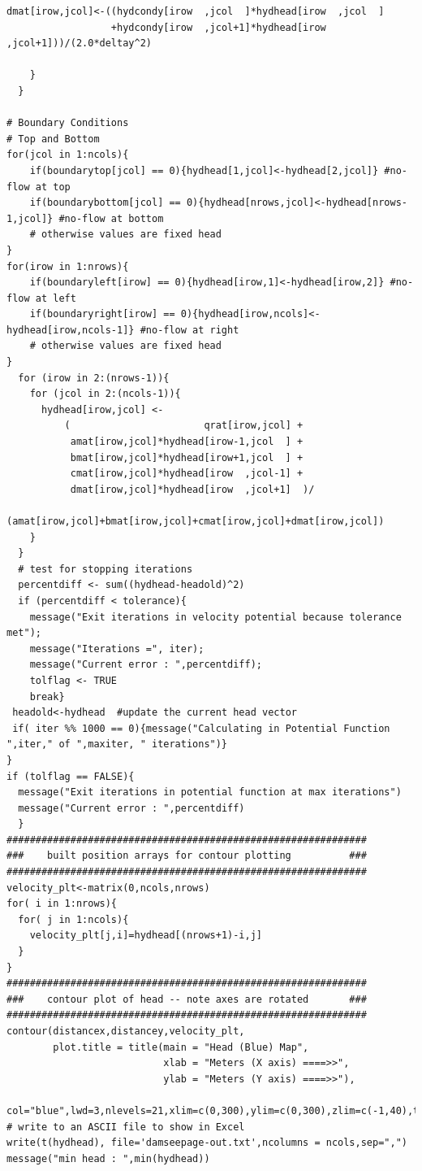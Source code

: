 \begin{lstlisting}[caption= \textbf{R} script implementing unconfined aquifer flow computations with wells and generalized boundary conditions. , label=lst:UnconfinedSteady]
      dmat[irow,jcol]<-((hydcondy[irow  ,jcol  ]*hydhead[irow  ,jcol  ]
                  +hydcondy[irow  ,jcol+1]*hydhead[irow  ,jcol+1]))/(2.0*deltay^2)
      
    }
  }  
  
# Boundary Conditions
# Top and Bottom
for(jcol in 1:ncols){
    if(boundarytop[jcol] == 0){hydhead[1,jcol]<-hydhead[2,jcol]} #no-flow at top
    if(boundarybottom[jcol] == 0){hydhead[nrows,jcol]<-hydhead[nrows-1,jcol]} #no-flow at bottom
    # otherwise values are fixed head
}
for(irow in 1:nrows){
    if(boundaryleft[irow] == 0){hydhead[irow,1]<-hydhead[irow,2]} #no-flow at left
    if(boundaryright[irow] == 0){hydhead[irow,ncols]<-hydhead[irow,ncols-1]} #no-flow at right
    # otherwise values are fixed head
}
  for (irow in 2:(nrows-1)){
    for (jcol in 2:(ncols-1)){
      hydhead[irow,jcol] <- 
          (                       qrat[irow,jcol] +
           amat[irow,jcol]*hydhead[irow-1,jcol  ] +
           bmat[irow,jcol]*hydhead[irow+1,jcol  ] +
           cmat[irow,jcol]*hydhead[irow  ,jcol-1] +
           dmat[irow,jcol]*hydhead[irow  ,jcol+1]  )/
        (amat[irow,jcol]+bmat[irow,jcol]+cmat[irow,jcol]+dmat[irow,jcol])
    }
  }
  # test for stopping iterations
  percentdiff <- sum((hydhead-headold)^2)
  if (percentdiff < tolerance){
    message("Exit iterations in velocity potential because tolerance met");
    message("Iterations =", iter);
    message("Current error : ",percentdiff);
    tolflag <- TRUE
    break}
 headold<-hydhead  #update the current head vector
 if( iter %% 1000 == 0){message("Calculating in Potential Function ",iter," of ",maxiter, " iterations")}
}
if (tolflag == FALSE){
  message("Exit iterations in potential function at max iterations")
  message("Current error : ",percentdiff)
  }
##############################################################
###    built position arrays for contour plotting          ###
##############################################################
velocity_plt<-matrix(0,ncols,nrows) 
for( i in 1:nrows){
  for( j in 1:ncols){
    velocity_plt[j,i]=hydhead[(nrows+1)-i,j]
  }
}
##############################################################
###    contour plot of head -- note axes are rotated       ###
##############################################################
contour(distancex,distancey,velocity_plt,
        plot.title = title(main = "Head (Blue) Map",
                           xlab = "Meters (X axis) ====>>", 
                           ylab = "Meters (Y axis) ====>>"),
        col="blue",lwd=3,nlevels=21,xlim=c(0,300),ylim=c(0,300),zlim=c(-1,40),tck=1)
# write to an ASCII file to show in Excel
write(t(hydhead), file='damseepage-out.txt',ncolumns = ncols,sep=",") 
message("min head : ",min(hydhead))
\end{lstlisting}


